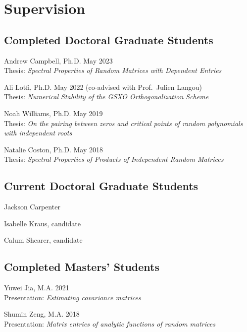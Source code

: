 \documentclass[letterpaper]{article}
\renewenvironment{itemize}{
  \begin{list}{}{
    \setlength{\leftmargin}{1em}
  }
}{
  \end{list}
}
\begin{document}
\section*{Supervision}

\subsection*{Completed Doctoral Graduate Students}
\begin{itemize}
	\item Andrew Campbell, Ph.D. May 2023 \\
	Thesis: \textit{Spectral Properties of Random Matrices with Dependent Entries}
	\item Ali Lotfi, Ph.D. May 2022 (co-advised with Prof.\  Julien Langou) \\
	Thesis: \textit{Numerical Stability of the GSXO Orthogonalization Scheme}
	\item Noah Williams, Ph.D. May 2019 \\
	Thesis: \textit{On the pairing between zeros and critical points of random polynomials with independent roots}
	\item Natalie Coston, Ph.D. May 2018 \\
	Thesis: \textit{Spectral Properties of Products of Independent Random Matrices}
\end{itemize}
	
	
\subsection*{Current Doctoral Graduate Students}
\begin{itemize}
	\item Jackson Carpenter
	\item Isabelle Kraus, candidate
	\item Calum Shearer, candidate 
\end{itemize}

\subsection*{Completed Masters' Students}
\begin{itemize}
	\item Yuwei Jia, M.A. 2021 \\
	Presentation: \textit{Estimating covariance matrices} 
	\item Shumin Zeng, M.A. 2018 \\
	Presentation: \textit{Matrix entries of analytic functions of random matrices}
\end{itemize}
\end{document}
